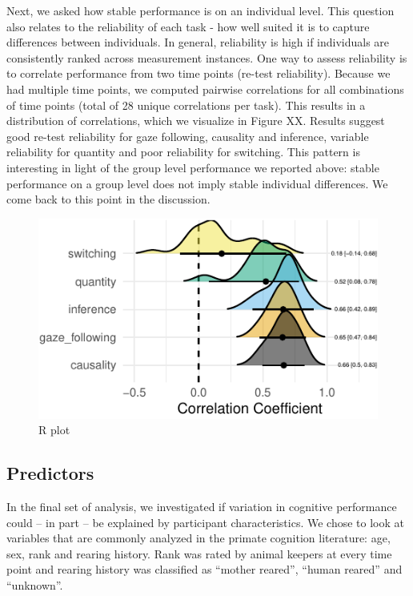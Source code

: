\documentclass[10pt, letterpaper]{article}
\newenvironment{CodeChunk}{}{}
\begin{document}
Next, we asked how stable performance is on an individual level. This
question also relates to the reliability of each task - how well suited
it is to capture differences between individuals. In general,
reliability is high if individuals are consistently ranked across
measurement instances. One way to assess reliability is to correlate
performance from two time points (re-test reliability). Because we had
multiple time points, we computed pairwise correlations for all
combinations of time points (total of 28 unique correlations per task).
This results in a distribution of correlations, which we visualize in
Figure XX. Results suggest good re-test reliability for gaze following,
causality and inference, variable reliability for quantity and poor
reliability for switching. This pattern is interesting in light of the
group level performance we reported above: stable performance on a group
level does not imply stable individual differences. We come back to this
point in the discussion.

\begin{CodeChunk}
\begin{figure}[H]

{\centering \includegraphics{figs/plot-1} 

}

\caption[R plot]{R plot}\label{fig:plot}
\end{figure}
\end{CodeChunk}

\hypertarget{predictors}{%
\subsection{Predictors}\label{predictors}}

In the final set of analysis, we investigated if variation in cognitive
performance could -- in part -- be explained by participant
characteristics. We chose to look at variables that are commonly
analyzed in the primate cognition literature: age, sex, rank and rearing
history. Rank was rated by animal keepers at every time point and
rearing history was classified as ``mother reared'', ``human reared''
and ``unknown''.
\end{document}

